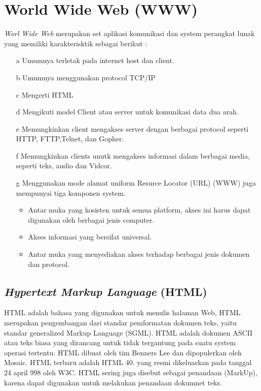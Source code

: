 \documentclass{jtetiproposalskripsi}
\begin{document}
\section{World Wide Web (WWW)}
\textit{Worl  Wide  Web}  merupakan  set  aplikasi  komunikasi  dan  system  perangkat lunak yang memiliki karakterisktik sebagai berikut :
\begin{itemize}
\item[a]Umumnya terletak pada internet host dan client. 
\item[b]Umumnya menggunakan protocol TCP/IP
\item[c]Mengerti HTML
\item[d]Mengikuti model Client  atau server untuk komunikasi data dua arah.
\item[e]Memungkinkan client mengakses server dengan berbagai protocol seperti HTTP, FTTP,Telnet, dan Gopher.
\item[f]Memungkinkan  clients  unutk  mengakses  informasi  dalam  berbagai  media, seperti teks, audio dan Vidcor.
\item[g]Menggunakan  mode  alamat  uniform  Resurce  Locator  (URL)  (WWW)  juga mempunyai tiga komponen system. 
\begin{itemize}
\item Antar  muka  yang  kosisten  untuk  semua  platform,  akses  ini  harus  dapat digunakan oleh berbagai jenis computer.
\item Akses informasi yang bersifat universal.
\item Antar  muka  yang  menyediakan  akses  terhadap  berbagai  jenis  dokumen  dan protocol.
\end{itemize}
\end{itemize}

\subsection{\textit{Hypertext Markup Language }(HTML)}
HTML adalah bahasa yang digunakan untuk menulis halaman Web, HTML merupakan pengembangan dari standar pemformatan dokumen teks, yaitu standar generalized Markup Language (SGML). HTML adalah dokumen ASCII atau teks biasa yang dirancang untuk tidak tergantung pada suatu system operasi tertentu. HTML dibuat oleh tim Benners Lee dan dipopulerkan oleh Mosaic. HTML terbaru adalah HTML 40. yang resmi dikeluarkan pada tanggal 24 april 998 oleh W3C. HTML sering juga disebut sebagai penandaan (MarkUp), karena dapat digunakan untuk melakukan penandaan dokumnet teks.
\end{document}
